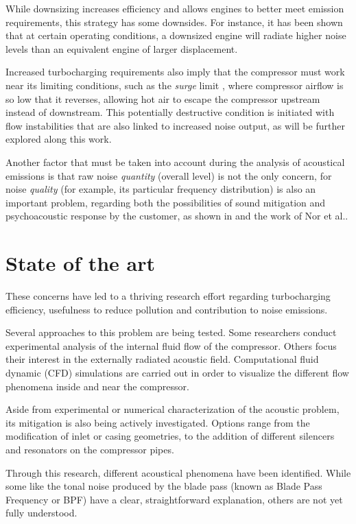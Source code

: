 While downsizing increases efficiency and allows engines to better meet emission requirements, this strategy has some downsides. For instance, it has been shown \cite{stoffels2003nvh} that at certain operating conditions, a downsized engine will radiate higher noise levels than an equivalent engine of larger displacement. 

Increased turbocharging requirements also imply that the compressor must work near its limiting conditions, such as the \emph{surge} limit \cite{teng2009investigation}, where compressor airflow is so low that it reverses, allowing hot air to escape the compressor upstream instead of downstream. This potentially destructive condition is initiated with flow instabilities that are also linked to increased noise output, as will be further explored along this work.

Another factor that must be taken into account during the analysis of acoustical emissions is that raw noise \emph{quantity} (overall level) is not the only concern, for noise \emph{quality} (for example, its particular frequency distribution) is also an important problem, regarding both the possibilities of sound mitigation and psychoacoustic response by the customer, as shown in \cite{brizon2012combining} and the work of Nor et al.\cite{nor2008index}.

\section{State of the art}

These concerns have led to a thriving research effort regarding turbocharging efficiency, usefulness to reduce pollution and contribution to noise emissions.

Several approaches to this problem are being tested. Some researchers conduct experimental analysis of the internal fluid flow of the compressor. Others focus their interest in the externally radiated acoustic field. Computational fluid dynamic (CFD) simulations are carried out in order to visualize the different flow phenomena inside and near the compressor.

Aside from experimental or numerical characterization of the acoustic problem, its mitigation is also being actively investigated. Options range from the modification of inlet or casing geometries, to the addition of different silencers and resonators on the compressor pipes.

Through this research, different acoustical phenomena have been identified. While some like the tonal noise produced by the blade pass (known as Blade Pass Frequency or BPF) have a clear, straightforward explanation, others are not yet fully understood.

